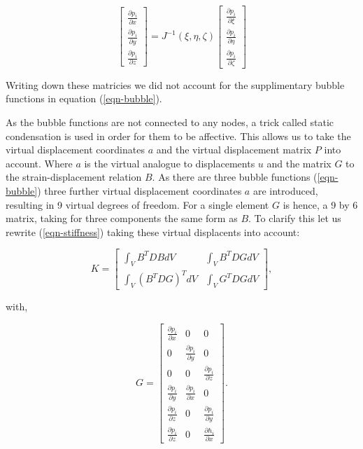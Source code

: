 \begin{equation}
  \left[\begin{array}{c}
      \frac{\partial p_i}{\partial x} \\
      \frac{\partial p_i}{\partial y} \\
      \frac{\partial p_i}{\partial z}
    \end{array}\right]
  =
  J^{-1}{(\xi,\eta,\zeta)}
  \left[\begin{array}{c}
      \frac{\partial p_i}{\partial \xi} \\
      \frac{\partial p_i}{\partial \eta} \\
      \frac{\partial p_i}{\partial \zeta}
    \end{array}\right]
\end{equation}

Writing down these
matricies we did not account for the supplimentary bubble functions
in equation (\ref{eqn-bubble}).

As the bubble functions are not connected to any nodes, a trick called
static condensation is used in order for them to be affective. This 
allows us to take the virtual displacement coordinates $a$ and the
virtual displacement matrix $P$ into account. Where $a$ is the virtual
analogue to displacements $u$ and the matrix $G$ to the strain-displacement
relation $B$. As there are three bubble functions (\ref{eqn-bubble})
three further virtual displacement coordinates $a$ are introduced,
resulting in 9 virtual degrees of freedom. For a single element $G$ is
hence, a 9 by 6 matrix, taking for three components the same form as $B$.
To clarify this let us rewrite (\ref{eqn-stiffness}) taking these
virtual displacents into account: 

\begin{equation}
  K = \left[\begin{array}{cc}
      \int_V B^{T}DB dV & \int_V B^{T}DG dV \\
      \int_V(B^{T}DG)^{T} dV & \int_VG^{T}DG dV
    \end{array}\right],
  \label{eqn-stiffness-and-virtual}
\end{equation}

with,

\begin{equation}
  G = \left[\begin{array}{ccc}
      \frac{\partial p_i}{\partial x} & 0 & 0 \\
      0 & \frac{\partial p_i}{\partial y} & 0 \\
      0 & 0 & \frac{\partial p_i}{\partial z} \\
      \frac{\partial p_i}{\partial y} &
      \frac{\partial p_i}{\partial x} & 0 \\
      \frac{\partial p_i}{\partial z} & 0 &
      \frac{\partial p_i}{\partial y} \\
      \frac{\partial p_i}{\partial z} & 0 & \frac{\partial h_i}{\partial x}
    \end{array}
    \right].
\end{equation}

